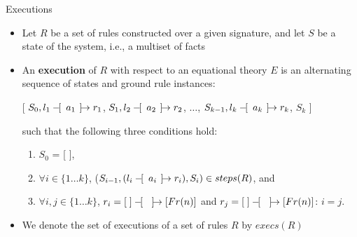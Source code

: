 \documentclass[11pt,aspectratio=169]{beamer}
\begin{document}
\begin{frame}[fragile]{Executions}
    \begin{itemize}
        \item Let $R$ be a set of rules constructed over a given signature, and 
              let $S$ be a state of the system, i.e., a multiset of facts
        \item An \textbf{execution} of $R$ with respect to an equational theory 
              $E$ is an alternating sequence of states and ground rule 
              instances:
        \begin{center}
            [ $S_0, l_1 -\hspace{-4pt}[\hspace{5pt} a_1 \hspace{4pt}]\hspace{-4.6pt}\rightarrow r_1$,
              $S_1, l_2 -\hspace{-4pt}[\hspace{5pt} a_2 \hspace{4pt}]\hspace{-4.6pt}\rightarrow r_2$, $\dots$,
              $S_{k-1}, l_k -\hspace{-4pt}[\hspace{5pt} a_k \hspace{4pt}]\hspace{-4.6pt}\rightarrow r_k$, $S_k$ ]
        \end{center}
        such that the following three conditions hold:
        \begin{enumerate}
            \item $S_0$ = [ ],
            \item $\forall i \in \{1 \dots k\}$, ($S_{i-1}, 
                  (l_i -\hspace{-4pt}[\hspace{5pt} a_i \hspace{4pt}]\hspace{-4.6pt}\rightarrow r_i), S_i) \in steps(R)$, and
            \item $\forall i,j \in \{1 \dots k\}$,
                  $r_i = \MSR{[\;]}{}{[Fr(n)]}$ and
                  $r_j = \MSR{[\;]}{}{[Fr(n)]}$: $i=j$.
        \end{enumerate}
        \item We denote the set of executions of a set of rules $R$ by
              $execs(R)$
    \end{itemize}
\end{frame}
\end{document}

